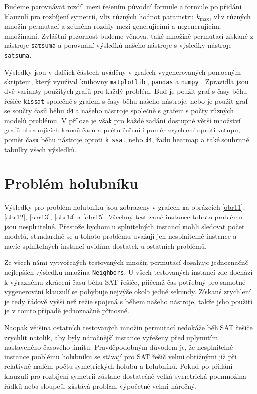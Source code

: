 Budeme porovnávat rozdíl mezi řešením původní
formule a formule po přidání klauzulí pro rozbíjení symetrií, vliv různých hodnot parametru $k_{\max}$, vliv různých množin permutací a zejména
rozdíly mezi generujícími a negenerujícími množinami. Zvláštní pozornost
budeme věnovat také množině permutací získané z nástroje \texttt{satsuma} a
porovnání výsledků našeho nástroje s výsledky nástroje \texttt{satsuma}.

Výsledky jsou v dalších částech uváděny v grafech vygenerovaných pomocným skriptem,
který využíval knihovny \texttt{matplotlib} \cite{Hunter:2007}, \texttt{pandas} \cite{reback2020pandas} a \texttt{numpy} \cite{harris2020array}. 
Zpravidla jsou dvě varianty použitých grafů pro každý problém. Buď je použit graf s časy běhu řešiče \texttt{kissat} společně s grafem s časy běhu našeho nástroje, nebo je použit graf se součty časů běhu \texttt{d4} a našeho nástroje společně s grafem s počty různých modelů problému. V příloze je však pro každé zadání dostupné větší množství grafů obsahujících kromě časů a počtu řešení i poměr zrychlení oproti vstupu, poměr času 
běhu nástroje oproti \texttt{kissat} nebo \texttt{d4}, řadu heatmap a také souhrnné tabulky všech výsledků.

\section{Problém holubníku}

Výsledky pro problém holubníku jsou zobrazeny v grafech na obrázcích \ref{obr11}, \ref{obr12}, \ref{obr13}, \ref{obr14} a \ref{obr15}. Všechny testované instance tohoto problému jsou nesplnitelné. Přestože bychom u splnitelných instancí mohli sledovat počet modelů, standardně se u tohoto problému uvažují jen nesplnitelné instance a navíc splnitelných instancí uvidíme dostatek u ostatních problémů.

Ze všech námi vytvořených testovaných množin permutací dosahuje jednoznačně nejlepších výsledků množina \texttt{Neighbors}. U všech testovaných instancí zde dochází k výraznému zkrácení času běhu SAT řešiče, přičemž čas potřebný pro samotné vygenerování klauzulí se pohybuje nejvýše okolo jedné sekundy. Získané zrychlení je tedy řádově vyšší než režie spojená s během našeho nástroje, takže jeho použití je v tomto případě jednoznačně přínosné.

Naopak většina ostatních testovaných množin permutací nedokáže běh SAT řešiče zrychlit natolik, aby byly náročnější instance vyřešeny před uplynutím nastaveného časového limitu. Pravděpodobným důvodem je, že nesplnitelné instance problému holubníku se stávají pro SAT řešič velmi obtížnými již při relativně malém počtu symetrických holubů a holubníků. Pokud po přidání klauzulí pro rozbíjení symetrií zůstane dostatečně velká symetrická podmnožina řádků nebo sloupců, zůstává problém výpočetně velmi náročný.


